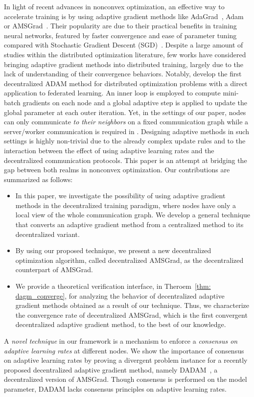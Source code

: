 \documentclass{article} %
\begin{document}
In light of recent advances in nonconvex optimization, an effective way to accelerate training is by using adaptive gradient methods like AdaGrad~\citep{duchi2011adaptive}, Adam~\citep{kingma2014adam} or AMSGrad~\citep{reddi2019convergence}. 
Their popularity are due to their practical benefits in training neural networks, featured by faster convergence and ease of parameter tuning compared with Stochastic Gradient Descent (SGD)~\citep{robbins1951stochastic}.
Despite a large amount of studies within the distributed optimization literature, few works have considered bringing adaptive gradient methods into distributed training, largely due to the lack of understanding of their convergence behaviors. 
Notably, \citet{reddi2020adaptive} develop the first decentralized ADAM method for distributed optimization problems with a direct application to federated learning.
An inner loop is employed to compute mini-batch gradients on each node and a global adaptive step is applied to update the global parameter at each outer iteration.
Yet, in the settings of our paper, nodes can only communicate \emph{to their neighbors} on a fixed communication graph while a server/worker communication is required in \citet{reddi2020adaptive}.
Designing adaptive methods in such settings is highly non-trivial due to the already complex update rules and to the interaction between the effect of using adaptive learning rates and the decentralized communication protocols.
This paper is an attempt at bridging the gap between both realms in nonconvex optimization. 
Our contributions are summarized as follows:
\begin{itemize}
\item In this paper, we investigate the possibility of using adaptive gradient methods in the decentralized training paradigm, where nodes have only a local view of the whole communication graph. We develop a general technique that converts an adaptive gradient method from a centralized method to its decentralized variant.
\item By using our proposed technique, we present a new decentralized optimization algorithm, called decentralized AMSGrad, as the decentralized counterpart of AMSGrad.
\item We provide a theoretical verification interface, in Theroem~\ref{thm: dagm_converge}, for analyzing the behavior of decentralized adaptive gradient methods obtained as a result of our technique.
Thus, we characterize the convergence rate of decentralized AMSGrad, which is the first convergent decentralized adaptive gradient method, to the best of our knowledge.
\end{itemize}
A \emph{novel technique} in our framework is a mechanism to enforce a \emph{consensus on adaptive learning rates} at different nodes. 
We show the importance of consensus on adaptive learning rates by proving a divergent problem instance for a recently proposed decentralized adaptive gradient method, namely DADAM~\citep{nazari2019dadam}, a decentralized version of AMSGrad. 
Though consensus is performed on the model parameter, DADAM lacks consensus principles on adaptive learning rates.
\end{document}
